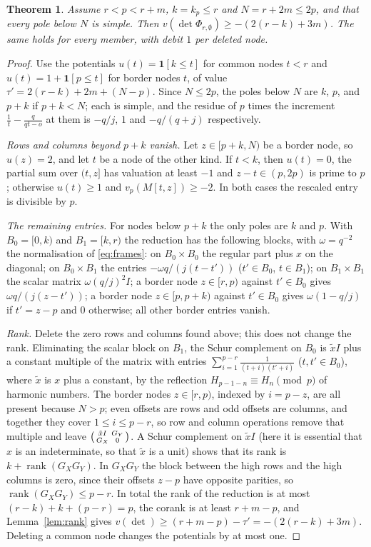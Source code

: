 \documentclass[11pt]{amsart}
\newtheorem{theorem}{Theorem}[section]
\theoremstyle{definition}
\theoremstyle{remark}
\numberwithin{equation}{section}
\newcommand{\rank}{\operatorname{rank}}
\begin{document}
\begin{theorem}\label{thm:lp2}
Assume $r<p<r+m$, $k=k_p\le r$ and $N=r+2m\le2p$, and that every pole below $N$ is simple. Then
$v(\det\Phi_{r,\emptyset})\ge-(2(r-k)+3m)$. The same holds for every member, with debit $1$ per deleted node.
\end{theorem}
\begin{proof}
Use the potentials $u(t)=\mathbf 1[k\le t]$ for common nodes $t<r$ and $u(t)=1+\mathbf 1[p\le t]$ for border nodes $t$, of value
$\tau'=2(r-k)+2m+(N-p)$. Since $N\le2p$, the poles below $N$ are $k$, $p$, and $p+k$ if $p+k<N$; each is simple, and the
residue of $p$ times the increment $\frac1t-\frac q{qt-o}$ at them is $-q/j$, $1$ and $-q/(q+j)$ respectively.

\emph{Rows and columns beyond $p+k$ vanish.} Let $z\in[p+k,N)$ be a border node, so $u(z)=2$, and let $t$ be a node of
the other kind. If $t<k$, then $u(t)=0$, the partial sum over $(t,z]$ has valuation at least $-1$ and $z-t\in(p,2p)$
is prime to $p$; otherwise $u(t)\ge1$ and $v_p(M[t,z])\ge-2$. In both cases the rescaled entry is divisible by $p$.

\emph{The remaining entries.} For nodes below $p+k$ the only poles are $k$ and $p$. With $B_0=[0,k)$ and $B_1=[k,r)$
the reduction has the following blocks, with $\omega=q^{-2}$ the normalisation of \eqref{eq:frames}: on $B_0\times B_0$ the
regular part plus $x$ on the diagonal; on $B_0\times B_1$ the entries $-\omega q/(j(t-t'))$ ($t'\in B_0$, $t\in B_1$); on $B_1\times B_1$ the scalar
matrix $\omega(q/j)^2I$; a border node $z\in[r,p)$ against $t'\in B_0$ gives $\omega q/(j(z-t'))$; a border node
$z\in[p,p+k)$ against $t'\in B_0$ gives $\omega(1-q/j)$ if $t'=z-p$ and $0$ otherwise; all other border entries vanish.

\emph{Rank.} Delete the zero rows and columns found above; this does not change the rank. Eliminating the scalar block
on $B_1$, the Schur complement on $B_0$ is $\tilde xI$ plus a constant multiple of the matrix with entries
$\sum_{i=1}^{p-r}\frac1{(t+i)(t'+i)}$ ($t,t'\in B_0$), where $\tilde x$ is $x$ plus a constant, by the reflection
$H_{p-1-n}\equiv H_n\pmod p$ of harmonic numbers. The border nodes $z\in[r,p)$, indexed by $i=p-z$, are all present because
$N>p$; even offsets are rows and odd offsets are columns, and together they cover $1\le i\le p-r$, so row and column
operations remove that multiple and leave
$\begin{psmallmatrix}\tilde xI&G_Y\\ G_X&0\end{psmallmatrix}$. A Schur complement on $\tilde xI$ (here it is essential that $x$
is an indeterminate, so that $\tilde x$ is a unit) shows that its rank is $k+\rank(G_XG_Y)$. In $G_XG_Y$ the block between the high
rows and the high columns is zero, since their offsets $z-p$ have opposite parities, so $\rank(G_XG_Y)\le p-r$. In
total the rank of the reduction is at most $(r-k)+k+(p-r)=p$, the corank is at least $r+m-p$, and
Lemma~\ref{lem:rank} gives $v(\det)\ge(r+m-p)-\tau'=-(2(r-k)+3m)$. Deleting a common node changes the potentials by at
most one.
\end{proof}
\end{document}
